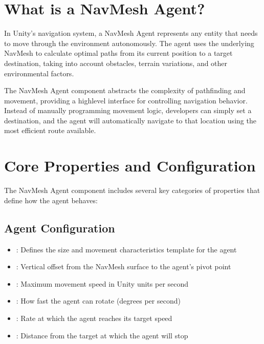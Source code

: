 \documentclass[letterpaper,10pt,english]{jupyterBook}
\begin{document}
\section{What is a NavMesh Agent?}
\label{\detokenize{Navmesh Agent:what-is-a-navmesh-agent}}
\sphinxAtStartPar
In Unity’s navigation system, a NavMesh Agent represents any entity that needs to move through the environment autonomously. The agent uses the underlying NavMesh to calculate optimal paths from its current position to a target destination, taking into account obstacles, terrain variations, and other environmental factors.

\sphinxAtStartPar
The NavMesh Agent component abstracts the complexity of pathfinding and movement, providing a high\sphinxhyphen{}level interface for controlling navigation behavior. Instead of manually programming movement logic, developers can simply set a destination, and the agent will automatically navigate to that location using the most efficient route available.


\section{Core Properties and Configuration}
\label{\detokenize{Navmesh Agent:core-properties-and-configuration}}
\sphinxAtStartPar
The NavMesh Agent component includes several key categories of properties that define how the agent behaves:


\subsection{Agent Configuration}
\label{\detokenize{Navmesh Agent:agent-configuration}}\begin{itemize}
\item {} 
\sphinxAtStartPar
{}: Defines the size and movement characteristics template for the agent

\item {} 
\sphinxAtStartPar
{}: Vertical offset from the NavMesh surface to the agent’s pivot point

\item {} 
\sphinxAtStartPar
{}: Maximum movement speed in Unity units per second

\item {} 
\sphinxAtStartPar
{}: How fast the agent can rotate (degrees per second)

\item {} 
\sphinxAtStartPar
{}: Rate at which the agent reaches its target speed

\item {} 
\sphinxAtStartPar
{}: Distance from the target at which the agent will stop

\end{itemize}
\end{document}

